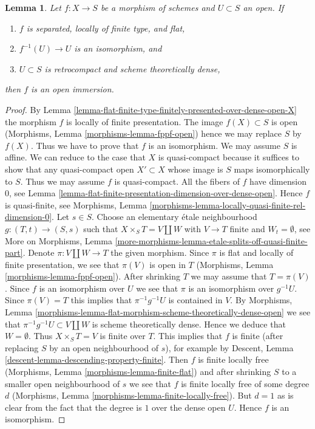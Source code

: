 \documentclass[10pt,a4paper]{amsart}
\theoremstyle{plain}
\newtheorem{lemma}[subsection]{Lemma}
\theoremstyle{definition}
\theoremstyle{remark}
\numberwithin{equation}{subsection}
\begin{document}
\begin{lemma}
\label{lemma-zariski}
Let $f : X \to S$ be a morphism of schemes and $U \subset S$ an open. If
\begin{enumerate}
\item $f$ is separated, locally of finite type, and flat,
\item $f^{-1}(U) \to U$ is an isomorphism, and
\item $U \subset S$ is retrocompact and scheme theoretically dense,
\end{enumerate}
then $f$ is an open immersion.
\end{lemma}

\begin{proof}
By Lemma \ref{lemma-flat-finite-type-finitely-presented-over-dense-open-X}
the morphism $f$ is locally of finite presentation.
The image $f(X) \subset S$ is open
(Morphisms, Lemma \ref{morphisms-lemma-fppf-open})
hence we may replace $S$ by $f(X)$. Thus we have to prove that
$f$ is an isomorphism. We may assume $S$ is affine. We can reduce
to the case that $X$ is quasi-compact because it suffices to show
that any quasi-compact open $X' \subset X$ whose image is $S$
maps isomorphically to $S$. Thus we may assume $f$ is quasi-compact.
All the fibers of $f$ have dimension $0$, see
Lemma \ref{lemma-flat-finite-presentation-dimension-over-dense-open}.
Hence $f$ is quasi-finite, see
Morphisms, Lemma \ref{morphisms-lemma-locally-quasi-finite-rel-dimension-0}.
Let $s \in S$. Choose an elementary \'etale
neighbourhood $g : (T, t) \to (S, s)$ such that $X \times_S T = V \amalg W$
with $V \to T$ finite and $W_t = \emptyset$, see
More on Morphisms, Lemma
\ref{more-morphisms-lemma-etale-splits-off-quasi-finite-part}.
Denote $\pi : V \amalg W \to T$ the given morphism. Since $\pi$ is
flat and locally of finite presentation, we see that $\pi(V)$ is
open in $T$ (Morphisms, Lemma \ref{morphisms-lemma-fppf-open}).
After shrinking $T$ we may assume that $T = \pi(V)$.
Since $f$ is an isomorphism over $U$ we see that $\pi$ is an
isomorphism over $g^{-1}U$. Since $\pi(V) = T$ this implies
that $\pi^{-1}g^{-1}U$ is contained in $V$.
By Morphisms, Lemma
\ref{morphisms-lemma-flat-morphism-scheme-theoretically-dense-open}
we see that $\pi^{-1}g^{-1}U \subset V \amalg W$ is scheme theoretically
dense. Hence we deduce that $W = \emptyset$.
Thus $X \times_S T = V$ is finite over $T$.
This implies that $f$ is finite (after replacing $S$ by an
open neighbourhood of $s$), for example by
Descent, Lemma \ref{descent-lemma-descending-property-finite}.
Then $f$ is finite locally free
(Morphisms, Lemma \ref{morphisms-lemma-finite-flat})
and after shrinking $S$ to a smaller open neighbourhood of $s$
we see that $f$ is finite locally free of some degree $d$
(Morphisms, Lemma \ref{morphisms-lemma-finite-locally-free}).
But $d = 1$ as is clear from the fact that the degree is $1$ over
the dense open $U$. Hence $f$ is an isomorphism.
\end{proof}
\end{document}
